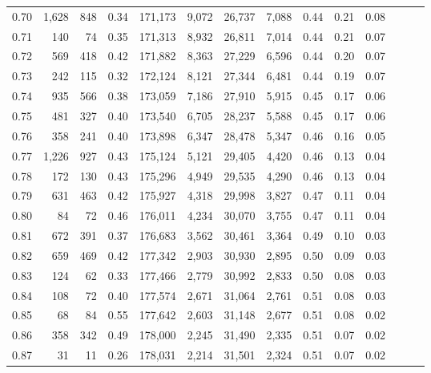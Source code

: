 \begin{tabular}{rrrrrrrrrrrrrr}
0.70 &   1,628 &    848 &  0.34 &  171,173 &    9,072 &  26,737 &   7,088 &  0.44 &  0.21 &      0.08 \\
0.71 &     140 &     74 &  0.35 &  171,313 &    8,932 &  26,811 &   7,014 &  0.44 &  0.21 &      0.07 \\
0.72 &     569 &    418 &  0.42 &  171,882 &    8,363 &  27,229 &   6,596 &  0.44 &  0.20 &      0.07 \\
0.73 &     242 &    115 &  0.32 &  172,124 &    8,121 &  27,344 &   6,481 &  0.44 &  0.19 &      0.07 \\
0.74 &     935 &    566 &  0.38 &  173,059 &    7,186 &  27,910 &   5,915 &  0.45 &  0.17 &      0.06 \\
0.75 &     481 &    327 &  0.40 &  173,540 &    6,705 &  28,237 &   5,588 &  0.45 &  0.17 &      0.06 \\
0.76 &     358 &    241 &  0.40 &  173,898 &    6,347 &  28,478 &   5,347 &  0.46 &  0.16 &      0.05 \\
0.77 &   1,226 &    927 &  0.43 &  175,124 &    5,121 &  29,405 &   4,420 &  0.46 &  0.13 &      0.04 \\
0.78 &     172 &    130 &  0.43 &  175,296 &    4,949 &  29,535 &   4,290 &  0.46 &  0.13 &      0.04 \\
0.79 &     631 &    463 &  0.42 &  175,927 &    4,318 &  29,998 &   3,827 &  0.47 &  0.11 &      0.04 \\
0.80 &      84 &     72 &  0.46 &  176,011 &    4,234 &  30,070 &   3,755 &  0.47 &  0.11 &      0.04 \\
0.81 &     672 &    391 &  0.37 &  176,683 &    3,562 &  30,461 &   3,364 &  0.49 &  0.10 &      0.03 \\
0.82 &     659 &    469 &  0.42 &  177,342 &    2,903 &  30,930 &   2,895 &  0.50 &  0.09 &      0.03 \\
0.83 &     124 &     62 &  0.33 &  177,466 &    2,779 &  30,992 &   2,833 &  0.50 &  0.08 &      0.03 \\
0.84 &     108 &     72 &  0.40 &  177,574 &    2,671 &  31,064 &   2,761 &  0.51 &  0.08 &      0.03 \\
0.85 &      68 &     84 &  0.55 &  177,642 &    2,603 &  31,148 &   2,677 &  0.51 &  0.08 &      0.02 \\
0.86 &     358 &    342 &  0.49 &  178,000 &    2,245 &  31,490 &   2,335 &  0.51 &  0.07 &      0.02 \\
0.87 &      31 &     11 &  0.26 &  178,031 &    2,214 &  31,501 &   2,324 &  0.51 &  0.07 &      0.02 \\

\end{tabular}
